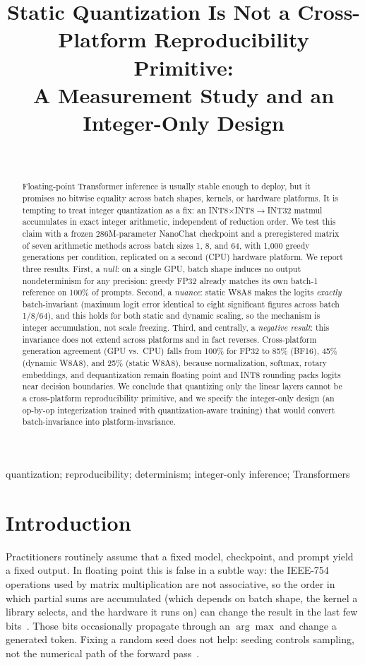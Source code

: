 \documentclass[wcp]{jmlr}
\title[Static Quantization Is Not a Cross-Platform Reproducibility Primitive]%
{Static Quantization Is Not a Cross-Platform Reproducibility Primitive:\\
A Measurement Study and an Integer-Only Design}
\author{\Name{Anonymous Author(s)} \Email{}\\
\addr }
\begin{document}
\maketitle

\begin{abstract}
Floating-point Transformer inference is usually stable enough to deploy, but it
promises no bitwise equality across batch shapes, kernels, or hardware platforms.
It is tempting to treat integer quantization as a fix: an INT8$\times$INT8$\to$INT32
matmul accumulates in exact integer arithmetic, independent of reduction order.
We test this claim with a frozen 286M-parameter NanoChat checkpoint and a
preregistered matrix of seven arithmetic methods across batch sizes 1, 8, and 64,
with 1{,}000 greedy generations per condition, replicated on a second (CPU)
hardware platform. We report three results. First, a \emph{null}: on a single GPU,
batch shape induces no output nondeterminism for any precision: greedy FP32
already matches its own batch-1 reference on 100\% of prompts. Second, a
\emph{nuance}: static W8A8 makes the logits \emph{exactly} batch-invariant (maximum
logit error identical to eight significant figures across batch 1/8/64), and this
holds for both static and dynamic scaling, so the mechanism is integer
accumulation, not scale freezing. Third, and centrally, a \emph{negative result}:
this invariance does not extend across platforms and in fact reverses. Cross-platform
generation agreement (GPU vs.\ CPU) falls from 100\% for FP32 to 85\% (BF16), 45\%
(dynamic W8A8), and 25\% (static W8A8), because normalization, softmax, rotary
embeddings, and dequantization remain floating point and INT8 rounding packs logits
near decision boundaries. We conclude that quantizing only the linear layers cannot
be a cross-platform reproducibility primitive, and we specify the integer-only
design (an op-by-op integerization trained with quantization-aware training) that
would convert batch-invariance into platform-invariance.
\end{abstract}

\begin{keywords}
quantization; reproducibility; determinism; integer-only inference; Transformers
\end{keywords}

\section{Introduction}
Practitioners routinely assume that a fixed model, checkpoint, and prompt yield a
fixed output. In floating point this is false in a subtle way: the IEEE-754
operations used by matrix multiplication are not associative, so the order in which
partial sums are accumulated (which depends on batch shape, the kernel a library
selects, and the hardware it runs on) can change the result in the last few
bits~\citep{pytorch_numerical}. Those bits occasionally propagate through an
$\arg\max$ and change a generated token. Fixing a random seed does not help:
seeding controls sampling, not the numerical path of the forward
pass~\citep{pytorch_reproducibility,he2025nondeterminism}.
\end{document}
